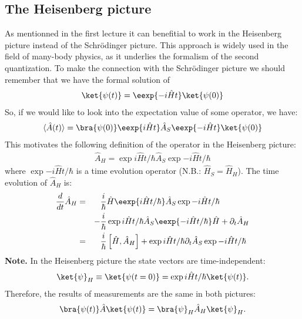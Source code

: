 \subsection{The Heisenberg picture}
As mentionned in the first lecture it can benefitial to work in the Heisenberg picture instead of the Schrödinger picture. This approach is widely used in the field of many-body physics, as it underlies the formalism of the second quantization. To make the connection with  the Schrödinger picture we should remember that we have the formal solution of
\begin{align}
\ket{\psi(t)} = \eexp{-i\hat{H}t}\ket{\psi(0)}
\end{align}
So, if we would like to look into the expectation value of some operator, we have:
\begin{align}
\langle\hat{A}(t)\rangle = \bra{\psi(0)}\eexp{i\hat{H}t}\hat{A}_S\eexp{-i\hat{H}t}\ket{\psi(0)}
\end{align}
This motivates the following definition of the operator in the Heisenberg picture:
\begin{align}
    \hat{A}_H=\exp{i{\hat{H} t}/{\hbar}} \hat{A}_S \exp{-i{\hat{H} t}/{\hbar}}
\end{align}
where $\exp{-i{\hat{H} t}/{\hbar}}$ is a time evolution operator (N.B.: $\hat{H}_S = \hat{H}_H$). The time evolution of $\hat{A}_H$ is:
\begin{align}
    \notag \frac{d}{dt} \hat{A}_H &=&& \frac{i}{\hbar}\hat{H}\eexp{i{\hat{H}t}/{\hbar}}\hat{A}_S \exp{-i{\hat{H} t}/{\hbar}}\\ 
    &&-&\frac{i}{\hbar} \exp{i{\hat{H} t}/{\hbar}}\hat{A}_S \eexp{-i{\hat{H}t}/{\hbar}}\hat{H}+\partial_t \hat{A}_H\\
    &=&& \frac{i}{\hbar}\left[\hat{H},\hat{A}_H\right] + \exp{i{\hat{H}t}/{\hbar}}\partial_t\hat{A}_S\exp{-i{\hat{H}t}/{\hbar}}
\end{align}
\textbf{Note.} In the Heisenberg picture the state vectors are time-independent:
\begin{align}
    \ket{\psi}_H \equiv \ket{\psi(t=0)}=\exp{i{\hat{H}}t/{\hbar}} \ket{\psi(t)}.
\end{align}
Therefore, the results of measurements are the same in both pictures:
\begin{align}
 \bra{\psi(t)}\hat{A}\ket{\psi(t)} = \bra{\psi}_H \hat{A}_H \ket{\psi}_H.
\end{align}